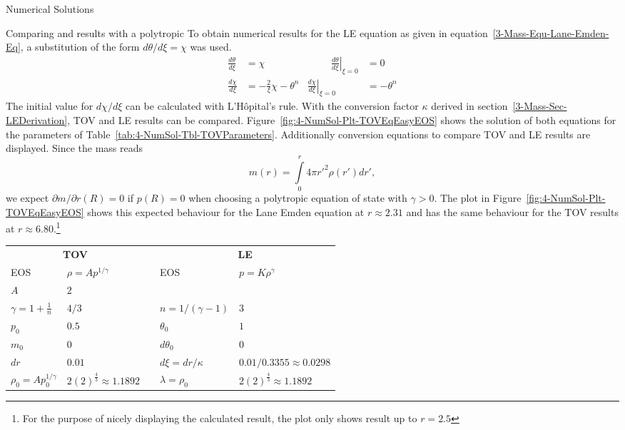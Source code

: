 \begin{section}{Numerical Solutions}
\begin{subsection}{Comparing \texorpdfstring{}{TOV} and \texorpdfstring{}{LE} results with a polytropic \texorpdfstring{}{EoS}}
To obtain numerical results for the \ac{LE} equation as given in equation~\eqref{3-Mass-Equ-Lane-Emden-Eq}, a substitution of the form $d\theta/d\xi=\chi$ was used.
\begin{equation}
	\begin{aligned}
		\frac{d\theta}{d\xi} &= \chi &\hspace{1cm} \left.\frac{d\theta}{d\xi}\right|_{\xi=0} &= 0\\
		\frac{d\chi}{d\xi} &= -\frac{2}{\xi}\chi-\theta^n & \left.\frac{d\chi}{d\xi}\right|_{\xi=0} &= -\theta^n
		\label{4-NumSol-Equ-LE-Substitution}
	\end{aligned}
\end{equation}
The initial value for $d\chi/d\xi$ can be calculated with L'Hôpital's rule.
With the conversion factor $\kappa$ derived in section~\ref{3-Mass-Sec-LEDerivation}, \ac{TOV} and \ac{LE} results can be compared.
Figure~\ref{fig:4-NumSol-Plt-TOVEqEasyEOS} shows the solution of both equations for the parameters of Table~\ref{tab:4-NumSol-Tbl-TOVParameters}.
Additionally conversion equations to compare \ac{TOV} and \ac{LE} results are displayed.
Since the mass reads
\[
	m(r) = \int\limits_0^r 4\pi r'^2\rho(r')dr',
\]
we expect $\partial m/\partial r(R)=0$ if $p(R)=0$ when choosing a polytropic equation of state with $\gamma>0$.
The plot in Figure~\ref{fig:4-NumSol-Plt-TOVEqEasyEOS} shows this expected behaviour for the Lane Emden equation at $r\approx2.31$ and has the same behaviour for the \ac{TOV} results at $r\approx6.80$.\footnote{For the purpose of nicely displaying the calculated result, the plot only shows result up to $r=2.5$}
\begin{table}[H]
	{\renewcommand{\arraystretch}{1.2}
	\centering
	\begin{tabular}{@{}llcll@{}}
		\toprule
		\multicolumn{2}{c}{\textbf{TOV}} & \phantom{abc} &\multicolumn{2}{c}{\textbf{LE}}\\
		\cmidrule{1-2} \cmidrule{4-5}
		EOS & $\rho=Ap^{1/\gamma}$ && EOS & $p=K\rho^{\gamma}$\\
		$A$ & $2$ & & \\
		$\gamma=1+\frac{1}{n}$ & $4/3$ && $n=1/(\gamma-1)$ & $3$\\
		$p_0$ & $0.5$ && $\theta_0$ & $1$\\
		$m_0$ & $0$ && $d\theta_0$ & $0$\\
		$dr$ & $0.01$ && $d\xi=dr/\kappa$ & $0.01/0.3355\approx0.0298$\\
		\cmidrule{1-2} \cmidrule{4-5}
		$\rho_0=Ap_0^{1/\gamma}$ & $2(2)^{\frac{4}{3}}\approx1.1892$ && $\lambda=\rho_0$ & $2(2)^{\frac{4}{3}}\approx1.1892$\\

\end{tabular}}
\end{table}
\end{subsection}
\end{section}
